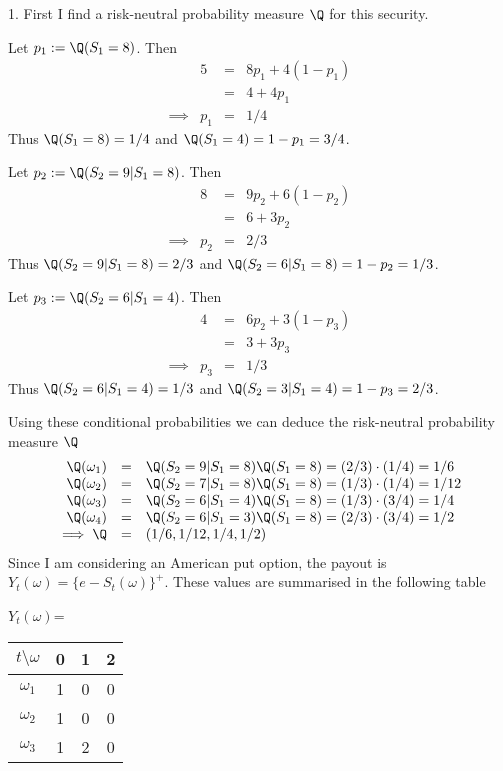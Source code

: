 \documentclass[11pt,a4paper]{article}
\begin{document}
\begin{answer}{1.}
  First I find a risk-neutral probability measure $\Q$ for this security.
  \par Let $p_1:=\Q(S_1=8)$. Then
  \[\begin{array}{rrcl}
    &5&=&8p_1+4(1-p_1)\\
    &&=&4+4p_1\\
    \implies&p_1&=&1/4
  \end{array}\]
  Thus $\Q(S_1=8)=1/4$ and $\Q(S_1=4)=1-p_1=3/4$.
  \par Let $p_2:=\Q(S_2=9|S_1=8)$. Then
  \[\begin{array}{rrcl}
    &8&=&9p_2+6(1-p_2)\\
    &&=&6+3p_2\\
    \implies&p_2&=&2/3
  \end{array}\]
  Thus $\Q(S_2=9|S_1=8)=2/3$ and $\Q(S_2=6|S_1=8)=1-p_2=1/3$.
  \par Let $p_3:=\Q(S_2=6|S_1=4)$. Then
  \[\begin{array}{rrcl}
    &4&=&6p_2+3(1-p_3)\\
    &&=&3+3p_3\\
    \implies&p_3&=&1/3
  \end{array}\]
  Thus $\Q(S_2=6|S_1=4)=1/3$ and $\Q(S_2=3|S_1=4)=1-p_3=2/3$.
  \par Using these conditional probabilities we can deduce the risk-neutral probability measure $\Q$
  \[\begin{array}{rcl}
    \Q(\omega_1)&=&\Q(S_2=9|S_1=8)\Q(S_1=8)=(2/3)\cdot(1/4)=1/6\\
    \Q(\omega_2)&=&\Q(S_2=7|S_1=8)\Q(S_1=8)=(1/3)\cdot(1/4)=1/12\\
    \Q(\omega_3)&=&\Q(S_2=6|S_1=4)\Q(S_1=8)=(1/3)\cdot(3/4)=1/4\\
    \Q(\omega_4)&=&\Q(S_2=6|S_1=3)\Q(S_1=8)=(2/3)\cdot(3/4)=1/2\\
    \implies\Q&=&(1/6,1/12,1/4,1/2)
  \end{array}\]
  Since I am considering an American put option, the payout is $Y_t(\omega)=\{e-S_t(\omega)\}^+$. These values are summarised in the following table
  \begin{center}
    $Y_t(\omega)$=\begin{tabular}{c|ccc}
        $t\setminus\omega$&0&1&2\\\hline
        $\omega_1$&1&0&0\\
        $\omega_2$&1&0&0\\
        $\omega_3$&1&2&0\\

\end{tabular}
\end{center}
\end{answer}
\end{document}
